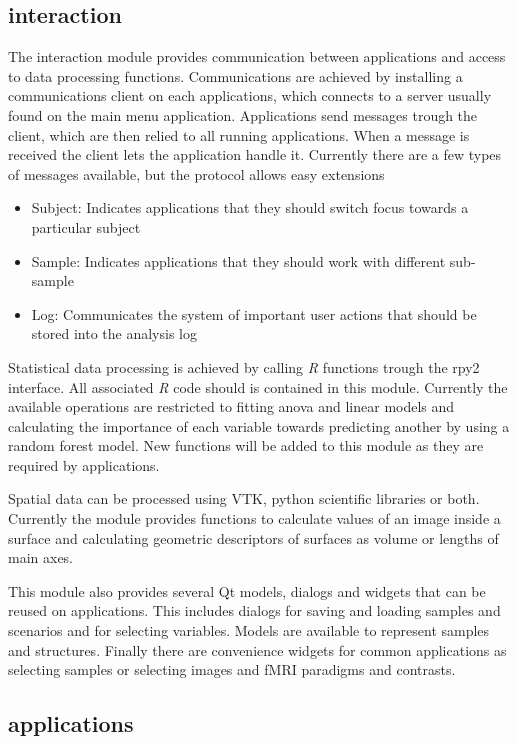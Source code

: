\subsection{interaction}

The interaction module provides communication between applications and access to data processing functions. Communications are achieved by installing a communications client on each applications, which connects to a server usually found on the main menu application. Applications send messages trough the client, which are then relied to all running applications. When a message is received the client lets the application handle it. Currently there are a few types of messages available, but the protocol allows easy extensions

\begin{itemize}
\item Subject: Indicates applications that they should switch focus towards a particular subject
\item Sample: Indicates applications that they should work with different sub-sample
\item Log: Communicates the system of important user actions that should be stored into the analysis log
\end{itemize}


Statistical data processing is achieved by calling \emph{R} functions trough the rpy2 interface. All associated \emph{R} code should is contained in this module. Currently the available operations are restricted to fitting anova and linear models and calculating the importance of each variable towards predicting another by using a random forest model. New functions will be added to this module as they are required by applications. 

Spatial data can be processed using VTK, python scientific libraries or both. Currently the module provides functions to calculate values of an image inside a surface and calculating geometric descriptors of surfaces as volume or lengths of main axes.

This module also provides several Qt models, dialogs and widgets that can be reused on applications. This includes dialogs for saving and loading samples and scenarios and for selecting variables. Models are available to represent samples and structures. Finally there are convenience widgets for common applications as selecting samples or selecting images and fMRI paradigms and contrasts.

\subsection{applications}

